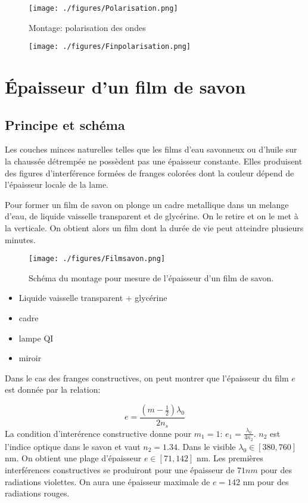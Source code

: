 \documentclass[french]{article}
\begin{document}
\begin{figure}
	\centering
	\texttt{[image: ./figures/Polarisation.png]}
	\caption{Montage: polarisation des ondes}
\end{figure}

\begin{figure}
	\centering
	\texttt{[image: ./figures/Finpolarisation.png]}
\end{figure}
\newpage
\section{Épaisseur d'un film de savon}

\subsection{Principe et schéma}
Les couches minces naturelles telles que les films d'eau savonneux ou d'huile sur la chaussée détrempée ne possèdent pas une épaisseur constante. Elles produisent des figures d'interférence formées de franges colorées dont la couleur dépend de l'épaisseur locale de la lame.\vspace{.5cm}


Pour former un film de savon on plonge un cadre metallique dans un melange d'eau, de liquide vaisselle transparent et de glycérine. On le retire et on le met à la verticale. On obtient alors un film dont la durée de vie peut atteindre plusieurs minutes.

\begin{figure}[!ht]
	\centering
	\texttt{[image: ./figures/Filmsavon.png]}
	\caption{Schéma du montage pour mesure de l'épaisseur d'un film de savon.}
\end{figure}


\begin{remarque}
	\begin{itemize}
		\item Liquide vaisselle transparent + glycérine
		\item cadre
		\item lampe QI
		\item miroir
	\end{itemize}
\end{remarque}


Dans le cas des franges constructives, on peut montrer que l'épaisseur du film $e$ est donnée par la relation: 

\begin{equation}
	e = \frac{\left(m-\frac{1}{2}\right)\lambda_0}{2n_s}
\end{equation}
La condition d'interérence constructive donne pour $m_1 = 1$: $e_1  = \frac{\lambda_0}{4n_2}$. $n_2$ est l'indice optique dans le savon et vaut $n_2 = 1.34$. Dans le visible $\lambda_0 \in [380, 760]$ nm. On obtient une plage d'épaisseur $e\in[71, 142]$ nm. Les premières interférences constructives se produiront pour une épaisseur de $71 nm$ pour des radiations violettes. On aura une épaisseur maximale de $e=142$ nm pour des radiations rouges.
\end{document}
